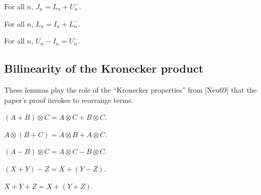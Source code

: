 \begin{lemma}
  \label{lem:J_eq_L_add_Um}
  \leanok
  For all $n$, $J_n = L_n + U^-_n$.
\end{lemma}

\begin{lemma}
  \label{lem:L_eq_Id_add_Lm}
  \leanok
  For all $n$, $L_n = I_n + L^-_n$.
\end{lemma}

\begin{lemma}
  \label{lem:U_sub_Id_eq_Um}
  \leanok
  For all $n$, $U_n - I_n = U^-_n$.
\end{lemma}

\subsection{Bilinearity of the Kronecker product}

These lemmas play the role of the ``Kronecker properties'' from
[Neu69] that the paper's proof invokes to rearrange terms.

\begin{lemma}
  \label{lem:kron_add_left}
  \leanok
  $(A + B) \otimes C = A \otimes C + B \otimes C$.
\end{lemma}

\begin{lemma}
  \label{lem:kron_add_right}
  \leanok
  $A \otimes (B + C) = A \otimes B + A \otimes C$.
\end{lemma}

\begin{lemma}
  \label{lem:kron_sub_left}
  \leanok
  $(A - B) \otimes C = A \otimes C - B \otimes C$.
\end{lemma}

\begin{lemma}
  \label{lem:mat_add_sub}
  \leanok
  $(X + Y) - Z = X + (Y - Z)$.
\end{lemma}

\begin{lemma}
  \label{lem:mat_add_assoc}
  \leanok
  $X + Y + Z = X + (Y + Z)$.
\end{lemma}


